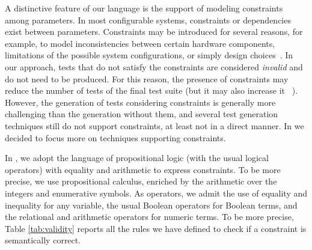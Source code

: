 \begin{tikzborder}{\cite{Gargantini16:validation}}
\begin{tikzborder}{\cite{gargantini_combinatorial_2017}}
\begin{tikzborder}{\cite{garn2019}}
\begin{tikzborder}{\cite{arcaini2019achieving}}
\begin{tikzborder}{}
A distinctive feature of our language is the support of modeling constraints among parameters. 
In most configurable systems, constraints or dependencies exist between parameters. 
Constraints may be introduced for several reasons, for example, to model inconsistencies between certain hardware components, limitations of the possible system configurations, or simply design choices~\cite{CohenISSTA07}.
In our approach, tests that do not satisfy the constraints are considered \emph{invalid} and do not need to
be produced. 
For this reason, the presence of constraints may reduce the number of tests of the final test suite (but it may also increase it ~\cite{CohenISSTA07}).
However, the generation of tests considering constraints is generally more challenging than the generation without them, and several test generation techniques still do not support constraints, at least not in a direct manner.
In \ctwedge we decided to focus more on techniques supporting constraints.

In \ctwedge, we adopt the language of propositional logic (with the usual logical operators) with equality and arithmetic to express constraints. 
To be more precise, we use propositional calculus, enriched by the arithmetic over the integers and enumerative symbols. As operators, we admit the use of equality and inequality for any variable, the usual Boolean operators for Boolean terms, and the relational and arithmetic operators for numeric terms. 
To be more precise, Table \ref{tab:validity} reports all the rules we have defined to check if a constraint is semantically correct.
\end{tikzborder}

\begin{table}
	\centering
\end{table}
\end{tikzborder}
\end{tikzborder}
\end{tikzborder}
\end{tikzborder}

